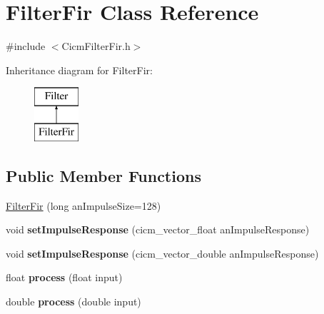 \hypertarget{class_filter_fir}{\section{Filter\-Fir Class Reference}
\label{class_filter_fir}
}


{\ttfamily \#include $<$Cicm\-Filter\-Fir.\-h$>$}

Inheritance diagram for Filter\-Fir\-:\begin{figure}[H]
\begin{center}
\leavevmode
\includegraphics[height=2.000000cm]{class_filter_fir}
\end{center}
\end{figure}
\subsection*{Public Member Functions}
\begin{DoxyCompactItemize}
\item 
\hyperlink{class_filter_fir_abcab39dfa873e970726d22a1ba6be737}{Filter\-Fir} (long an\-Impulse\-Size=128)
\item 
\hypertarget{class_filter_fir_a3974b796ce6147611991dbca668ea8fa}{void {\bfseries set\-Impulse\-Response} (cicm\-\_\-vector\-\_\-float an\-Impulse\-Response)}\label{class_filter_fir_a3974b796ce6147611991dbca668ea8fa}

\item 
\hypertarget{class_filter_fir_af49512720e54e2388d36c310ef77b327}{void {\bfseries set\-Impulse\-Response} (cicm\-\_\-vector\-\_\-double an\-Impulse\-Response)}\label{class_filter_fir_af49512720e54e2388d36c310ef77b327}

\item 
\hypertarget{class_filter_fir_adc63b066e4a6774fbafa6a4d2bb74e96}{float {\bfseries process} (float input)}\label{class_filter_fir_adc63b066e4a6774fbafa6a4d2bb74e96}

\item 
\hypertarget{class_filter_fir_a52821e4b331b0cfa7724db923d2c2361}{double {\bfseries process} (double input)}\label{class_filter_fir_a52821e4b331b0cfa7724db923d2c2361}

\end{DoxyCompactItemize}
